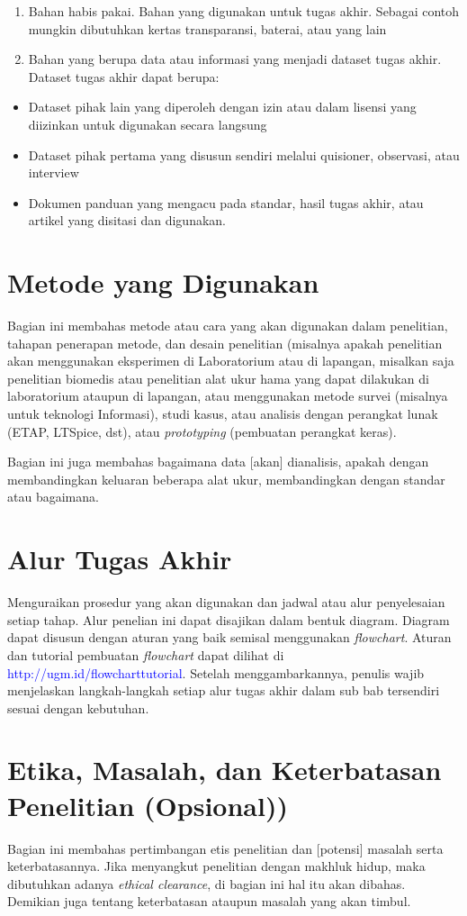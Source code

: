 \begin{enumerate}
	\item Bahan habis pakai. Bahan yang digunakan untuk tugas akhir. Sebagai contoh 
	mungkin dibutuhkan kertas transparansi, baterai, atau yang lain 
	\item Bahan yang berupa data atau informasi yang menjadi dataset tugas akhir. Dataset tugas akhir dapat berupa:
\end{enumerate}
\begin{itemize}
	\item Dataset pihak lain yang diperoleh dengan izin atau dalam lisensi yang diizinkan untuk digunakan secara langsung 
	\item Dataset pihak pertama yang disusun sendiri melalui quisioner, observasi, atau interview 
	\item Dokumen panduan yang mengacu pada standar, hasil tugas akhir, atau artikel yang disitasi dan digunakan.
\end{itemize}


\section{Metode yang Digunakan}

Bagian ini membahas metode atau cara yang akan digunakan dalam penelitian, tahapan 
penerapan metode, dan desain penelitian (misalnya apakah penelitian akan menggunakan 
eksperimen di Laboratorium atau di lapangan, misalkan saja penelitian biomedis atau 
penelitian alat ukur hama yang dapat dilakukan di laboratorium ataupun di lapangan, atau menggunakan metode survei (misalnya untuk teknologi Informasi), studi kasus, atau analisis dengan perangkat lunak (ETAP, LTSpice, dst), atau \textit{prototyping} (pembuatan perangkat keras).

Bagian ini juga membahas bagaimana data [akan] dianalisis, apakah dengan membandingkan keluaran beberapa alat ukur, membandingkan dengan standar atau bagaimana.

\section{Alur Tugas Akhir}

Menguraikan prosedur yang akan digunakan dan jadwal atau alur penyelesaian setiap 
tahap. Alur penelian ini dapat disajikan dalam bentuk diagram. Diagram dapat disusun dengan aturan yang baik semisal menggunakan \textit{flowchart}. Aturan dan tutorial pembuatan \textit{flowchart} dapat dilihat di \textcolor{blue}{http://ugm.id/flowcharttutorial}. Setelah menggambarkannya, penulis wajib menjelaskan langkah-langkah setiap alur tugas akhir dalam sub bab tersendiri sesuai dengan kebutuhan.

\section{Etika, Masalah, dan Keterbatasan Penelitian (Opsional))}

Bagian ini membahas pertimbangan etis penelitian dan [potensi] masalah serta
keterbatasannya. Jika menyangkut penelitian dengan makhluk hidup, maka dibutuhkan adanya \textit{ethical clearance}, di bagian ini hal itu akan dibahas. Demikian juga tentang keterbatasan ataupun masalah yang akan timbul.
